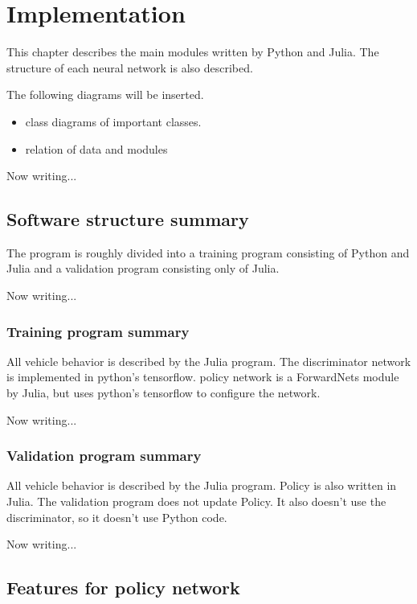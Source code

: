 \chapter{Implementation}
\label{chapter:Implementation}

This chapter describes the main modules written by Python and Julia.
The structure of each neural network is also described.

The following diagrams will be inserted.
\begin{itemize}
\item class diagrams of important classes.
\item relation of data and modules
\end{itemize}




Now writing...


\section{Software structure summary}

The program is roughly divided into a training program consisting of Python and Julia and a validation program consisting only of Julia.

Now writing...


\subsection{Training program summary}

All vehicle behavior is described by the Julia program. The discriminator network is implemented in python's tensorflow.
policy network is a ForwardNets module by Julia, but uses python's tensorflow to configure the network.

Now writing...


\subsection{Validation program summary}

All vehicle behavior is described by the Julia program. 
Policy is also written in Julia.
The validation program does not update Policy. It also doesn't use the discriminator, so it doesn't use Python code.

Now writing...


\section{Features for policy network}


